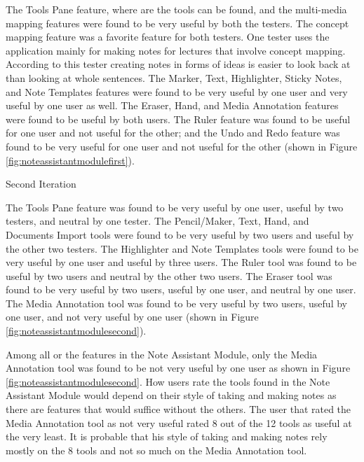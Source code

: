\begin{raggedright}
The Tools Pane feature, where are the tools can be found, and the multi-media mapping features were found to be very useful by both the testers. The concept mapping feature was a favorite feature for both testers. One tester uses the application mainly for making notes for lectures that involve concept mapping. According to this tester creating notes in forms of ideas is easier to look back at than looking at whole sentences. The Marker, Text, Highlighter, Sticky Notes, and Note Templates features were found to be very useful by one user and very useful by one user as well. The Eraser, Hand, and Media Annotation features were found to be useful by both users. The Ruler feature was found to be useful for one user and not useful for the other; and the Undo and Redo feature was found to be very useful for one user and not useful for the other (shown in Figure \ref{fig:noteassistantmodulefirst}). 
\end{raggedright}

\begin{flushleft}
Second Iteration
\end{flushleft}

\begin{raggedright}
The Tools Pane feature was found to be very useful by one user, useful by two testers, and neutral by one tester. The Pencil/Maker, Text, Hand, and Documents Import tools were found to be very useful by two users and useful by the other two testers. The Highlighter and Note Templates tools were found to be very useful by one user and useful by three users. The Ruler tool was found to be useful by two users and neutral by the other two users. The Eraser tool was found to be very useful by two users, useful by one user, and neutral by one user. The Media Annotation tool was found to be very useful by two users, useful by one user, and not very useful by one user (shown in Figure \ref{fig:noteassistantmodulesecond}).
\end{raggedright}

Among all or the features in the Note Assistant Module, only the Media Annotation tool was found to be not very useful by one user as shown in Figure \ref{fig:noteassistantmodulesecond}. How users rate the tools found in the Note Assistant Module would depend on their style of taking and making notes as there are features that would suffice without the others. The user that rated the Media Annotation tool as not very useful rated 8 out of the 12 tools as useful at the very least. It is probable that his style of taking and making notes rely mostly on the 8 tools and not so much on the Media Annotation tool.

